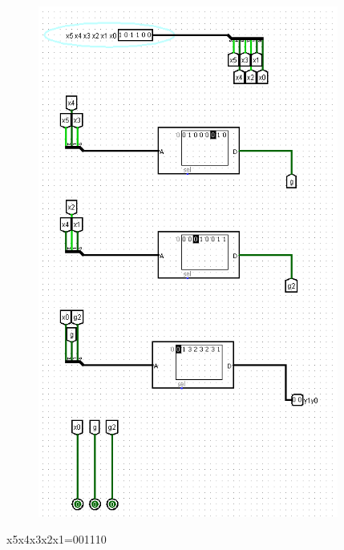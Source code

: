 \documentclass[]{article}
\begin{document}
\begin{figure}[H]
	\centering
	\includegraphics[width=0.88\textwidth]{test3_101100.png}
\end{figure}
x5x4x3x2x1=001110
\end{document}
